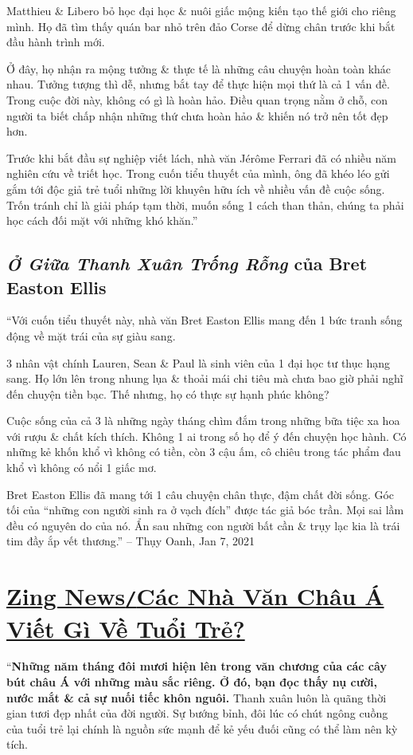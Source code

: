 \documentclass[oneside]{book}
\numberwithin{equation}{section}
\begin{document}
Matthieu \& Libero bỏ học đại học \& nuôi giấc mộng kiến tạo thế giới cho riêng mình. Họ đã tìm thấy quán bar nhỏ trên đảo Corse để dừng chân trước khi bắt đầu hành trình mới.

Ở đây, họ nhận ra mộng tưởng \& thực tế là những câu chuyện hoàn toàn khác nhau. Tưởng tượng thì dễ, nhưng bắt tay để thực hiện mọi thứ là cả 1 vấn đề. Trong cuộc đời này, không có gì là hoàn hảo. Điều quan trọng nằm ở chỗ, con người ta biết chấp nhận những thứ chưa hoàn hảo \& khiến nó trở nên tốt đẹp hơn.

Trước khi bắt đầu sự nghiệp viết lách, nhà văn J\'er\^ome Ferrari đã có nhiều năm nghiên cứu về triết học. Trong cuốn tiểu thuyết của mình, ông đã khéo léo gửi gắm tới độc giả trẻ tuổi những lời khuyên hữu ích về nhiều vấn đề cuộc sống. Trốn tránh chỉ là giải pháp tạm thời, muốn sống 1 cách than thản, chúng ta phải học cách đối mặt với những khó khăn.''

\subsection{\textit{Ở Giữa Thanh Xuân Trống Rỗng} của Bret Easton Ellis}
``Với cuốn tiểu thuyết này, nhà văn Bret Easton Ellis mang đến 1 bức tranh sống động về mặt trái của sự giàu sang.

3 nhân vật chính Lauren, Sean \& Paul là sinh viên của 1 đại học tư thục hạng sang. Họ lớn lên trong nhung lụa \& thoải mái chi tiêu mà chưa bao giờ phải nghĩ đến chuyện tiền bạc. Thế nhưng, họ có thực sự hạnh phúc không?

Cuộc sống của cả 3 là những ngày tháng chìm đắm trong những bữa tiệc xa hoa với rượu \& chất kích thích. Không 1 ai trong số họ để ý đến chuyện học hành. Có những kẻ khốn khổ vì không có tiền, còn 3 cậu ấm, cô chiêu trong tác phẩm đau khổ vì không có nổi 1 giấc mơ.

Bret Easton Ellis đã mang tới 1 câu chuyện chân thực, đậm chất đời sống. Góc tối của ``những con người sinh ra ở vạch đích'' được tác giả bóc trần. Mọi sai lầm đều có nguyên do của nó. Ẩn sau những con người bất cần \& trụy lạc kia là trái tim đầy ắp vết thương.'' -- Thụy Oanh, Jan 7, 2021


\section{\href{https://zingnews.vn/cac-nha-van-chau-a-viet-gi-ve-tuoi-tre-post1126430.html}{Zing News\texttt{/}Các Nhà Văn Châu Á Viết Gì Về Tuổi Trẻ?}}
``\textbf{Những năm tháng đôi mươi hiện lên trong văn chương của các cây bút châu Á với những màu sắc riêng. Ở đó, bạn đọc thấy nụ cười, nước mắt \& cả sự nuối tiếc khôn nguôi.} Thanh xuân luôn là quãng thời gian tươi đẹp nhất của đời người. Sự bướng bỉnh, đôi lúc có chút ngông cuồng của tuổi trẻ lại chính là nguồn sức mạnh để kẻ yếu đuối cũng có thể làm nên kỳ tích.
\end{document}
